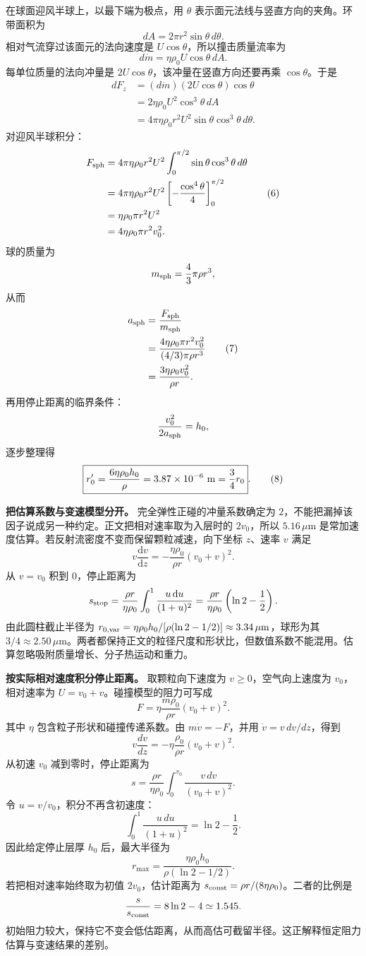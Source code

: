 \documentclass[12pt,a4paper,UTF8]{ctexart}
\begin{document}
在球面迎风半球上，以最下端为极点，用 \(\theta\)
表示面元法线与竖直方向的夹角。环带面积为 \[
dA=2\pi r^2\sin\theta\,d\theta.
\] 相对气流穿过该面元的法向速度是 \(U\cos\theta\)，所以撞击质量流率为 \[
d\dot m=\eta\rho_0U\cos\theta\,dA.
\] 每单位质量的法向冲量是 \(2U\cos\theta\)，该冲量在竖直方向还要再乘
\(\cos\theta\)。于是 \[
\begin{aligned}
dF_z
&=(d\dot m)(2U\cos\theta)\cos\theta\\
&=2\eta\rho_0U^2\cos^3\theta\,dA\\
&=4\pi\eta\rho_0r^2U^2
\sin\theta\cos^3\theta\,d\theta.
\end{aligned}
\] 对迎风半球积分： \[
\begin{aligned}
F_{\rm sph}
&=4\pi\eta\rho_0r^2U^2
\int_0^{\pi/2}\sin\theta\cos^3\theta\,d\theta\\
&=4\pi\eta\rho_0r^2U^2
\left[-\frac{\cos^4\theta}{4}\right]_0^{\pi/2}\\
&=\eta\rho_0\pi r^2U^2\\
&=4\eta\rho_0\pi r^2v_0^2.
\end{aligned} \tag{6}
\] 球的质量为 \[
m_{\rm sph}=\frac43\pi\rho r^3,
\] 从而 \[
\begin{aligned}
a_{\rm sph}
&=\frac{F_{\rm sph}}{m_{\rm sph}}\\
&=\frac{4\eta\rho_0\pi r^2v_0^2}{(4/3)\pi\rho r^3}\\
&=\frac{3\eta\rho_0v_0^2}{\rho r}.
\end{aligned} \tag{7}
\] 再用停止距离的临界条件： \[
\frac{v_0^2}{2a_{\rm sph}}=h_0,
\] 逐步整理得 \[
\boxed{r_0'=\frac{6\eta\rho_0h_0}{\rho}
=3.87\times10^{-6}\ {\rm m}
=\frac34r_0}. \tag{8}
\]

\textbf{把估算系数与变速模型分开。} 完全弹性正碰的冲量系数确定为
\(2\)，不能把漏掉该因子说成另一种约定。正文把相对速率取为入层时的
\(2v_0\)，所以 \(5.16\,\mu\mathrm m\)
是常加速度估算。若反射流密度不变而保留颗粒减速，向下坐标 \(z\)、速率
\(v\) 满足 \[
v\frac{\mathrm dv}{\mathrm dz}
=-\frac{\eta\rho_0}{\rho r}(v_0+v)^2.
\] 从 \(v=v_0\) 积到 \(0\)，停止距离为 \[
s_{\rm stop}=\frac{\rho r}{\eta\rho_0}
\int_0^1\frac{u\,\mathrm du}{(1+u)^2}
=\frac{\rho r}{\eta\rho_0}\left(\ln2-\frac12\right).
\] 由此圆柱截止半径为
\(r_{0,\rm var}=\eta\rho_0h_0/[\rho(\ln2-1/2)]\approx3.34\,\mu\mathrm m\)，球形为其
\(3/4\approx2.50\,\mu\mathrm m\)。两者都保持正文的粒径尺度和形状比，但数值系数不能混用。估算忽略吸附质量增长、分子热运动和重力。

\textbf{按实际相对速度积分停止距离。} 取颗粒向下速度为
\(v\ge0\)，空气向上速度为 \(v_0\)，相对速率为
\(U=v_0+v\)。碰撞模型的阻力可写成 \[
F=\eta\frac{m\rho_0}{\rho r}(v_0+v)^2.
\] 其中 \(\eta\) 包含粒子形状和碰撞传递系数。由 \(m\dot v=-F\)，并用
\(\dot v=v\,dv/dz\)，得到 \[
v\frac{dv}{dz}=-\eta\frac{\rho_0}{\rho r}(v_0+v)^2.
\] 从初速 \(v_0\) 减到零时，停止距离为 \[
s=\frac{\rho r}{\eta\rho_0}\int_0^{v_0}\frac{v\,dv}{(v_0+v)^2}.
\] 令 \(u=v/v_0\)，积分不再含初速度： \[
\int_0^1\frac{u\,du}{(1+u)^2}=\ln2-\frac12.
\] 因此给定停止层厚 \(h_0\) 后，最大半径为 \[
r_{\max}=\frac{\eta\rho_0h_0}{\rho(\ln2-1/2)}.
\] 若把相对速率始终取为初值 \(2v_0\)，估计距离为
\(s_{\rm const}=\rho r/(8\eta\rho_0)\)。二者的比例是 \[
\frac{s}{s_{\rm const}}=8\ln2-4\simeq1.545.
\]
初始阻力较大，保持它不变会低估距离，从而高估可截留半径。这正解释恒定阻力估算与变速结果的差别。
\end{document}
